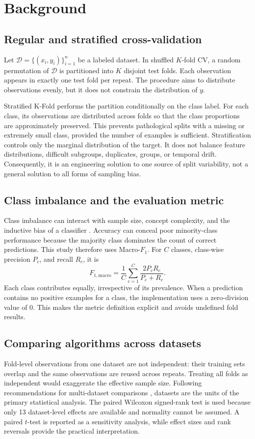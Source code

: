 \documentclass[twoside,11pt]{article}
\newcommand{\macrof}{Macro-$F_1$}
\begin{document}
\section{Background}
\subsection{Regular and stratified cross-validation}
Let $\mathcal{D}=\{(x_i,y_i)\}_{i=1}^{n}$ be a labeled dataset. In shuffled $K$-fold CV, a random permutation of $\mathcal{D}$ is partitioned into $K$ disjoint test folds. Each observation appears in exactly one test fold per repeat. The procedure aims to distribute observations evenly, but it does not constrain the distribution of $y$.

Stratified K-Fold performs the partition conditionally on the class label. For each class, its observations are distributed across folds so that the class proportions are approximately preserved. This prevents pathological splits with a missing or extremely small class, provided the number of examples is sufficient. Stratification controls only the marginal distribution of the target. It does not balance feature distributions, difficult subgroups, duplicates, groups, or temporal drift. Consequently, it is an engineering solution to one source of split variability, not a general solution to all forms of sampling bias.

\subsection{Class imbalance and the evaluation metric}
Class imbalance can interact with sample size, concept complexity, and the inductive bias of a classifier \citep{japkowicz2002}. Accuracy can conceal poor minority-class performance because the majority class dominates the count of correct predictions. This study therefore uses \macrof. For $C$ classes, class-wise precision $P_c$, and recall $R_c$, it is
\begin{equation}
F_{1,\mathrm{macro}}=\frac{1}{C}\sum_{c=1}^{C}\frac{2P_cR_c}{P_c+R_c}.
\end{equation}
Each class contributes equally, irrespective of its prevalence. When a prediction contains no positive examples for a class, the implementation uses a zero-division value of 0. This makes the metric definition explicit and avoids undefined fold results.

\subsection{Comparing algorithms across datasets}
Fold-level observations from one dataset are not independent: their training sets overlap and the same observations are reused across repeats. Treating all folds as independent would exaggerate the effective sample size. Following recommendations for multi-dataset comparisons \citep{demsar2006}, datasets are the units of the primary statistical analysis. The paired Wilcoxon signed-rank test is used because only 13 dataset-level effects are available and normality cannot be assumed. A paired $t$-test is reported as a sensitivity analysis, while effect sizes and rank reversals provide the practical interpretation.
\end{document}
